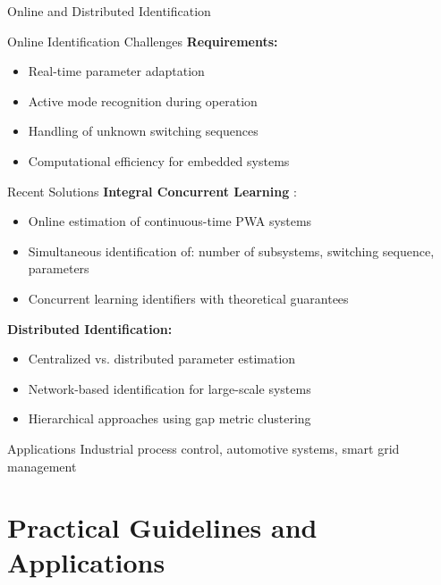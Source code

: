 \documentclass[aspectratio=169]{beamer}
\begin{document}
\begin{frame}{Online and Distributed Identification}
\begin{block}{Online Identification Challenges}
\textbf{Requirements:}
\begin{itemize}
\item Real-time parameter adaptation
\item Active mode recognition during operation
\item Handling of unknown switching sequences
\item Computational efficiency for embedded systems
\end{itemize}
\end{block}

\begin{block}{Recent Solutions}
\textbf{Integral Concurrent Learning} \cite{yang2021online}:
\begin{itemize}
\item Online estimation of continuous-time PWA systems
\item Simultaneous identification of: number of subsystems, switching sequence, parameters
\item Concurrent learning identifiers with theoretical guarantees
\end{itemize}

\textbf{Distributed Identification:}
\begin{itemize}
\item Centralized vs. distributed parameter estimation \cite{chen2021piecewise}
\item Network-based identification for large-scale systems
\item Hierarchical approaches using gap metric clustering \cite{lu2020pwa}
\end{itemize}
\end{block}

\begin{exampleblock}{Applications}
Industrial process control, automotive systems, smart grid management
\end{exampleblock}
\end{frame}

\section{Practical Guidelines and Applications}
\end{document}
